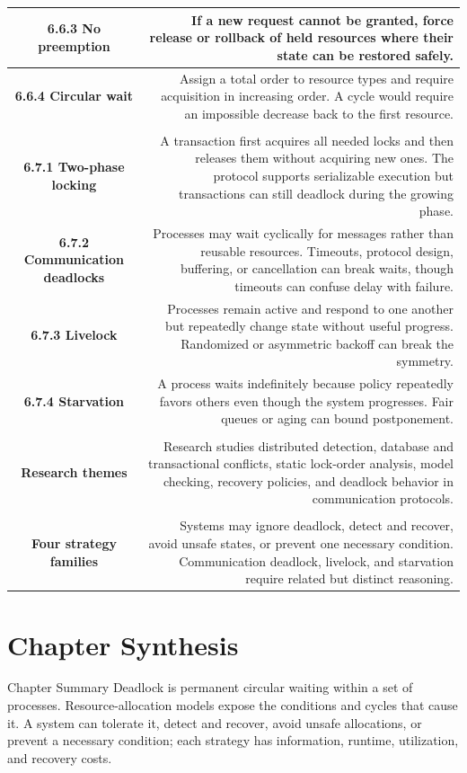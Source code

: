 \documentclass[10pt,letterpaper]{article}
\begin{document}
\begin{longtable}{C N}
\textbf{6.6.3 No preemption} & If a new request cannot be granted, force release or rollback of held resources where their state can be restored safely.\\\hline
\textbf{6.6.4 Circular wait} & Assign a total order to resource types and require acquisition in increasing order. A cycle would require an impossible decrease back to the first resource.\\\hline
{}\\*\hline
\textbf{6.7.1 Two-phase locking} & A transaction first acquires all needed locks and then releases them without acquiring new ones. The protocol supports serializable execution but transactions can still deadlock during the growing phase.\\\hline
\textbf{6.7.2 Communication deadlocks} & Processes may wait cyclically for messages rather than reusable resources. Timeouts, protocol design, buffering, or cancellation can break waits, though timeouts can confuse delay with failure.\\\hline
\textbf{6.7.3 Livelock} & Processes remain active and respond to one another but repeatedly change state without useful progress. Randomized or asymmetric backoff can break the symmetry.\\\hline
\textbf{6.7.4 Starvation} & A process waits indefinitely because policy repeatedly favors others even though the system progresses. Fair queues or aging can bound postponement.\\\hline
{}\\*\hline
\textbf{Research themes} & Research studies distributed detection, database and transactional conflicts, static lock-order analysis, model checking, recovery policies, and deadlock behavior in communication protocols.\\\hline
{}\\*\hline
\textbf{Four strategy families} & Systems may ignore deadlock, detect and recover, avoid unsafe states, or prevent one necessary condition. Communication deadlock, livelock, and starvation require related but distinct reasoning.\\\hline
\end{longtable}
\normalsize

\section*{Chapter Synthesis}
\begin{studybox}{Chapter Summary}
Deadlock is permanent circular waiting within a set of processes. Resource-allocation models expose the conditions and cycles that cause it. A system can tolerate it, detect and recover, avoid unsafe allocations, or prevent a necessary condition; each strategy has information, runtime, utilization, and recovery costs.
\end{studybox}
\end{document}
